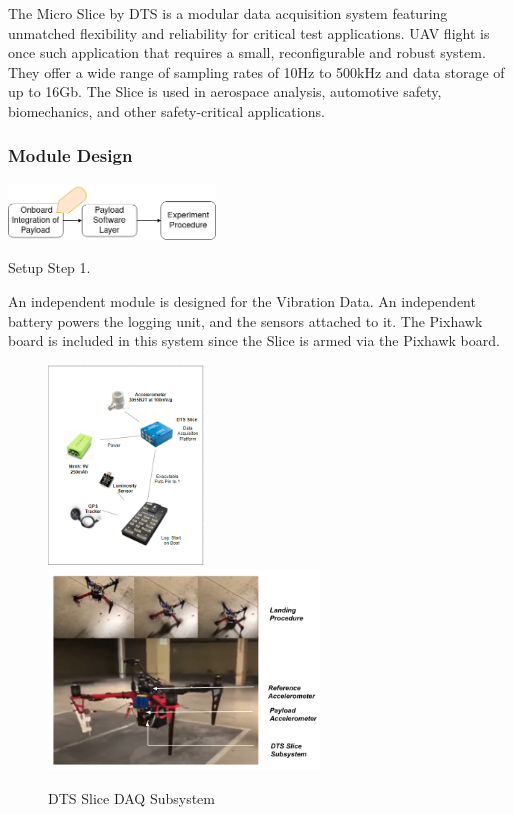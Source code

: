 The Micro Slice by DTS \cite{slice_docs} is a modular data acquisition system featuring unmatched flexibility and reliability for critical test applications. UAV flight is once such application that requires a small, reconfigurable and robust system. They offer a wide range of sampling rates of 10Hz to 500kHz and data storage of up to 16Gb. The Slice is used in aerospace analysis, automotive safety, biomechanics, and other safety-critical applications. 
        
\subsubsection{Module Design}  

\begin{marginfigure}%
    \raggedright
    \hspace{1.5cm}
    {\includegraphics[width=5.5cm]{images/stage_system/drone_setup/payload_onboard1.png}}
    \hspace{1cm}\caption{Setup Step 1.}
    \label{fig:zone_scan_prep1b}
\end{marginfigure}


An independent module is designed for the Vibration Data. An independent battery powers the logging unit, and the sensors attached to it. The Pixhawk board is included in this system since the Slice is armed via the Pixhawk board.

\begin{figure}[!h]
    \raggedright
    \includegraphics[height=5.3cm]{images/stage_system/slice_arch.PNG}
    \includegraphics[height=5.3cm]{images/stage_system/footstep_test.png}
    \caption{DTS Slice DAQ Subsystem}
    \label{connections:slice}
\end{figure}
        
